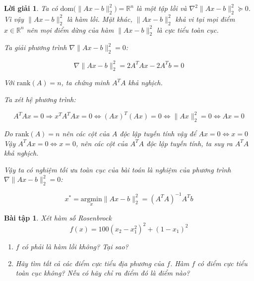 \documentclass[14pt, a4paper]{article}
\theoremstyle{sltheorem}
\newtheorem{baitap}{Bài tập}
\theoremstyle{soltheorem}
\newtheorem*{loigiai}{Lời giải}
\begin{document}
\begin{loigiai}
        Ta có $\mathrm{dom}\Big( \lVert Ax-b \rVert_2^2\Big)=\mathbb{R}^{n}$ là một tập lồi và $\nabla^2 \lVert Ax - b \rVert_2^2 \succeq 0$. Vì vậy $\lVert Ax - b \rVert_2^2$ là hàm lồi. Mặt khác, $\lVert Ax - b \rVert_2^2$ khả vi tại mọi điểm $x \in \mathbb{R}^{n}$ nên mọi điểm dừng của hàm $\lVert Ax - b \rVert_2^2$ là cực tiểu toàn cục.

        Ta giải phương trình $\nabla \lVert Ax - b \rVert_2^2=0$:

        \begin{equation*}
            \nabla \lVert Ax - b \rVert_2^2 = 2 A^T A x - 2 A^T b = 0
        \end{equation*}

        Với $\mathrm{rank}(A)=n$, ta chứng minh $A^T A$ khả nghịch.

        Ta xét hệ phương trình:

        \begin{equation*}
            A^T A x = 0 \Rightarrow x^T A^T A x = 0 \Leftrightarrow (Ax)^T (Ax) = 0 \Leftrightarrow \lVert Ax \rVert_2^2 =0 \Leftrightarrow Ax = 0
        \end{equation*}

        Do $\mathrm{rank}(A)=n$ nên các cột của $A$ độc lập tuyến tính vậy để $Ax=0 \Leftrightarrow x = 0$
        Vậy $A^T A x = 0 \Leftrightarrow x = 0$, nên các cột của $A^T A$ độc lập tuyến tính, ta suy ra $A^T A$ khả nghịch.

        Vậy ta có nghiệm tối ưu toàn cục của bài toán là nghiệm của phương trình $\nabla \lVert Ax - b \rVert_2^2=0$:

        \begin{equation*}
            x^* = \underset{x}{\mathrm{argmin}}\lVert Ax - b \rVert_2^2=(A^TA)^{-1}A^T b
        \end{equation*}
    \end{loigiai}

    \begin{baitap}
        Xét hàm số Rosenbrock
        \begin{equation*}
            f(x)=100(x_2 - x_1^2)^2 + (1-x_1)^2
        \end{equation*}
        \begin{enumerate}[wide, labelwidth=!, labelindent=0pt,label=\textbf{\arabic*}.]
            \item $f$ có phải là hàm lồi không? Tại sao?
            \item Hãy tìm tất cả các điểm cực tiểu địa phương của $f$. Hàm $f$ có điểm cực tiểu toàn cục không? Nếu có hãy chỉ ra điểm đó là điểm nào?
        \end{enumerate}
    \end{baitap}
\end{document}
